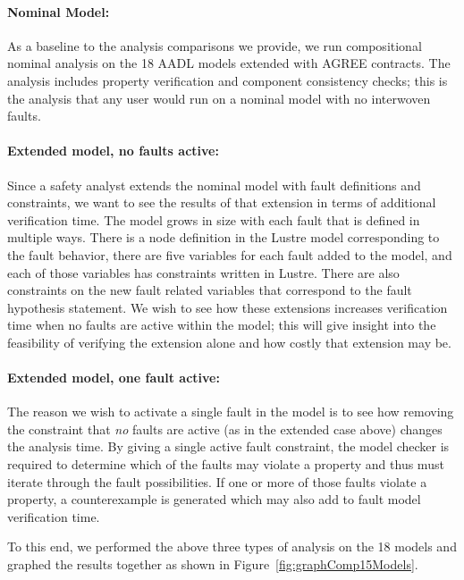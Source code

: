 \paragraph{Nominal Model:} As a baseline to the analysis comparisons we provide, we run compositional nominal analysis on the 18 AADL models extended with AGREE contracts. The analysis includes property verification and component consistency checks; this is the analysis that any user would run on a nominal model with no interwoven faults. 

\paragraph{Extended model, no faults active:} Since a safety analyst extends the nominal model with fault definitions and constraints, we want to see the results of that extension in terms of additional verification time. The model grows in size with each fault that is defined in multiple ways. There is a node definition in the Lustre model corresponding to the fault behavior, there are five variables for each fault added to the model, and each of those variables has constraints written in Lustre. There are also constraints on the new fault related variables that correspond to the fault hypothesis statement. We wish to see how these extensions increases verification time when no faults are active within the model; this will give insight into the feasibility of verifying the extension alone and how costly that extension may be. 

\paragraph{Extended model, one fault active:} The reason we wish to activate a single fault in the model is to see how removing the constraint that {\em no} faults are active (as in the extended case above) changes the analysis time. By giving a single active fault constraint, the model checker is required to determine which of the faults may violate a property and thus must iterate through the fault possibilities. If one or more of those faults violate a property, a counterexample is generated which may also add to fault model verification time. 

To this end, we performed the above three types of analysis on the 18 models and graphed the results together as shown in Figure~\ref{fig:graphComp15Models}. 

